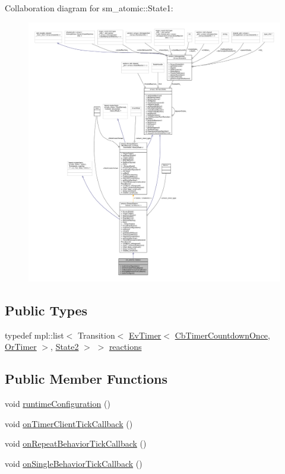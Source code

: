 Collaboration diagram for sm\+\_\+atomic\+:\+:State1\+:
\nopagebreak
\begin{figure}[H]
\begin{center}
\leavevmode
\includegraphics[width=350pt]{structsm__atomic_1_1State1__coll__graph}
\end{center}
\end{figure}
\subsection*{Public Types}
\begin{DoxyCompactItemize}
\item 
typedef mpl\+::list$<$ Transition$<$ \hyperlink{structros__timer__client_1_1EvTimer}{Ev\+Timer}$<$ \hyperlink{classros__timer__client_1_1CbTimerCountdownOnce}{Cb\+Timer\+Countdown\+Once}, \hyperlink{classsm__atomic_1_1OrTimer}{Or\+Timer} $>$, \hyperlink{structsm__atomic_1_1State2}{State2} $>$ $>$ \hyperlink{structsm__atomic_1_1State1_a38f44b3dfc4a7d81d4d2b7aca81171af}{reactions}
\end{DoxyCompactItemize}
\subsection*{Public Member Functions}
\begin{DoxyCompactItemize}
\item 
void \hyperlink{structsm__atomic_1_1State1_afe8195581873c22f5fcc5845a6654f8a}{runtime\+Configuration} ()
\item 
void \hyperlink{structsm__atomic_1_1State1_adea28f0a0fcedb210a29656f53aeee09}{on\+Timer\+Client\+Tick\+Callback} ()
\item 
void \hyperlink{structsm__atomic_1_1State1_a9d2c943f02a8e0f1d7b86132ada1c6e0}{on\+Repeat\+Behavior\+Tick\+Callback} ()
\item 
void \hyperlink{structsm__atomic_1_1State1_a9cb95d91cf5a22f0d9d079dc04bf58aa}{on\+Single\+Behavior\+Tick\+Callback} ()
\end{DoxyCompactItemize}

